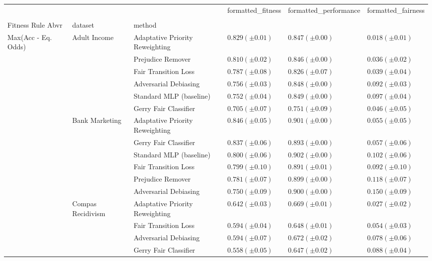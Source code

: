 \begin{tabular}{llllll}
\toprule
 &  &  & formatted_fitness & formatted_performance & formatted_fairness \\
 &  &  &  &  &  \\
Fitness Rule Abvr & dataset & method &  &  &  \\
\midrule
\multirow[t]{24}{*}{Max(Acc - Eq. Odds)} & \multirow[t]{6}{*}{Adult Income} & Adaptative Priority Reweighting & $0.829 (\pm0.01)$ & $0.847 (\pm0.00)$ & $0.018 (\pm0.01)$ \\
 &  & Prejudice Remover & $0.810 (\pm0.02)$ & $0.846 (\pm0.00)$ & $0.036 (\pm0.02)$ \\
 &  & Fair Transition Loss & $0.787 (\pm0.08)$ & $0.826 (\pm0.07)$ & $0.039 (\pm0.04)$ \\
 &  & Adversarial Debiasing & $0.756 (\pm0.03)$ & $0.848 (\pm0.00)$ & $0.092 (\pm0.03)$ \\
 &  & Standard MLP (baseline) & $0.752 (\pm0.04)$ & $0.849 (\pm0.00)$ & $0.097 (\pm0.04)$ \\
 &  & Gerry Fair Classifier & $0.705 (\pm0.07)$ & $0.751 (\pm0.09)$ & $0.046 (\pm0.05)$ \\
\cline{2-6}
 & \multirow[t]{6}{*}{Bank Marketing} & Adaptative Priority Reweighting & $0.846 (\pm0.05)$ & $0.901 (\pm0.00)$ & $0.055 (\pm0.05)$ \\
 &  & Gerry Fair Classifier & $0.837 (\pm0.06)$ & $0.893 (\pm0.00)$ & $0.057 (\pm0.06)$ \\
 &  & Standard MLP (baseline) & $0.800 (\pm0.06)$ & $0.902 (\pm0.00)$ & $0.102 (\pm0.06)$ \\
 &  & Fair Transition Loss & $0.799 (\pm0.10)$ & $0.891 (\pm0.01)$ & $0.092 (\pm0.10)$ \\
 &  & Prejudice Remover & $0.781 (\pm0.07)$ & $0.899 (\pm0.00)$ & $0.118 (\pm0.07)$ \\
 &  & Adversarial Debiasing & $0.750 (\pm0.09)$ & $0.900 (\pm0.00)$ & $0.150 (\pm0.09)$ \\
\cline{2-6}
 & \multirow[t]{6}{*}{Compas Recidivism} & Adaptative Priority Reweighting & $0.642 (\pm0.03)$ & $0.669 (\pm0.01)$ & $0.027 (\pm0.02)$ \\
 &  & Fair Transition Loss & $0.594 (\pm0.04)$ & $0.648 (\pm0.01)$ & $0.054 (\pm0.03)$ \\
 &  & Adversarial Debiasing & $0.594 (\pm0.07)$ & $0.672 (\pm0.02)$ & $0.078 (\pm0.06)$ \\
 &  & Gerry Fair Classifier & $0.558 (\pm0.05)$ & $0.647 (\pm0.02)$ & $0.088 (\pm0.04)$ \\

\end{tabular}
